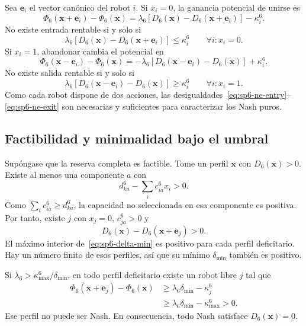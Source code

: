 Sea $\boldsymbol e_i$ el vector canónico del robot $i$. Si $x_i=0$, la ganancia potencial de unirse es
\[
 \Phi_6(\boldsymbol x+\boldsymbol e_i)-\Phi_6(\boldsymbol x)
 =\lambda_6\left[D_6(\boldsymbol x)-D_6(\boldsymbol x+\boldsymbol e_i)\right]-\kappa_i^6.
\]
No existe entrada rentable si y solo si
\begin{equation}
\label{eq:sp6-ne-entry}
 \lambda_6\left[D_6(\boldsymbol x)-D_6(\boldsymbol x+\boldsymbol e_i)\right]\leq\kappa_i^6
 \qquad\forall i:x_i=0.
\end{equation}
Si $x_i=1$, abandonar cambia el potencial en
\[
 \Phi_6(\boldsymbol x-\boldsymbol e_i)-\Phi_6(\boldsymbol x)
 =-\lambda_6\left[D_6(\boldsymbol x-\boldsymbol e_i)-D_6(\boldsymbol x)\right]+\kappa_i^6.
\]
No existe salida rentable si y solo si
\begin{equation}
\label{eq:sp6-ne-exit}
 \lambda_6\left[D_6(\boldsymbol x-\boldsymbol e_i)-D_6(\boldsymbol x)\right]\geq\kappa_i^6
 \qquad\forall i:x_i=1.
\end{equation}
Como cada robot dispone de dos acciones, las desigualdades~\eqref{eq:sp6-ne-entry}--\eqref{eq:sp6-ne-exit} son necesarias y suficientes para caracterizar los Nash puros.
\fi

\subsection{Factibilidad y minimalidad bajo el umbral}
\label{app:sp6-feasible-nash-proof}

Supóngase que la reserva completa es factible. Tome un perfil $\boldsymbol x$ con $D_6(\boldsymbol x)>0$. Existe al menos una componente $a$ con
\[
 d_{ka}^6-\sum_i c_{ia}^6x_i>0.
\]
Como $\sum_i c_{ia}^6\geq d_{ka}^6$, la capacidad no seleccionada en esa componente es positiva. Por tanto, existe $j$ con $x_j=0$, $c_{ja}^6>0$ y
\[
 D_6(\boldsymbol x)-D_6(\boldsymbol x+\boldsymbol e_j)>0.
\]
El máximo interior de~\eqref{eq:sp6-delta-min} es positivo para cada perfil deficitario. Hay un número finito de esos perfiles, así que su mínimo $\delta_{\min}$ también es positivo.

Si $\lambda_6>\kappa_{\max}^6/\delta_{\min}$, en todo perfil deficitario existe un robot libre $j$ tal que
\begin{align*}
 \Phi_6(\boldsymbol x+\boldsymbol e_j)-\Phi_6(\boldsymbol x)
 &\geq\lambda_6\delta_{\min}-\kappa_j^6\\
 &\geq\lambda_6\delta_{\min}-\kappa_{\max}^6>0.
\end{align*}
Ese perfil no puede ser Nash. En consecuencia, todo Nash satisface $D_6(\boldsymbol x)=0$.

